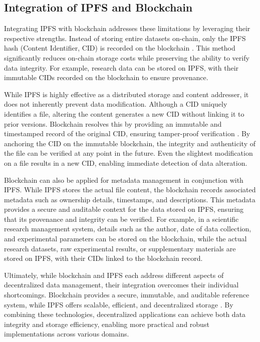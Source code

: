 \documentclass[final]{rc-book-2.14}
\begin{document}
\subsection{Integration of IPFS and Blockchain}

Integrating IPFS with blockchain addresses these limitations by leveraging their respective strengths. Instead of storing entire datasets on-chain, only the IPFS hash (Content Identifier, CID) is recorded on the blockchain \cite{steichen2018}. This method significantly reduces on-chain storage costs while preserving the ability to verify data integrity. For example, research data can be stored on IPFS, with their immutable CIDs recorded on the blockchain to ensure provenance.

While IPFS is highly effective as a distributed storage and content addresser, it does not inherently prevent data modification\cite{benet2014ipfs}. Although a CID uniquely identifies a file, altering the content generates a new CID without linking it to prior versions. Blockchain resolves this by providing an immutable and timestamped record of the original CID, ensuring tamper-proof verification \cite{nakamoto2008bitcoin}. By anchoring the CID on the immutable blockchain, the integrity and authenticity of the file can be verified at any point in the future. Even the slightest modification on a file results in a new CID, enabling immediate detection of data alteration.

Blockchain can also be applied for metadata management in conjunction with IPFS. While IPFS stores the actual file content, the blockchain records associated metadata such as ownership details, timestamps, and descriptions. This metadata provides a secure and auditable context for the data stored on IPFS, ensuring that its provenance and integrity can be verified. For example, in a scientific research management system, details such as the author, date of data collection, and experimental parameters can be stored on the blockchain, while the actual research datasets, raw experimental results, or supplementary materials are stored on IPFS, with their CIDs linked to the blockchain record.

Ultimately, while blockchain and IPFS each address different aspects of decentralized data management, their integration overcomes their individual shortcomings. Blockchain provides a secure, immutable, and auditable reference system, while IPFS offers scalable, efficient, and decentralized storage \cite{nakamoto2008bitcoin, benet2014ipfs}. By combining these technologies, decentralized applications can achieve both data integrity and storage efficiency, enabling more practical and robust implementations across various domains.
\end{document}
